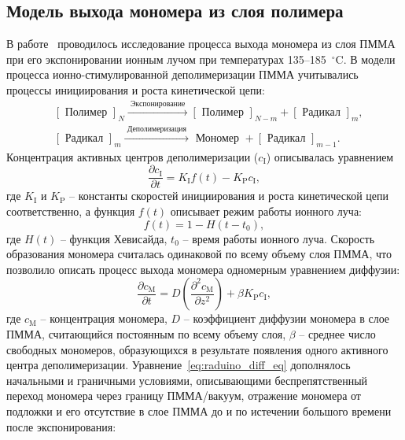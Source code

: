 \subsection{Модель выхода мономера из слоя полимера}
В работе~\cite{Fragala_3_diffusion} проводилось исследование процесса выхода мономера из слоя ПММА при его экспонировании ионным лучом при температурах 135--185~$^\circ$C. В модели процесса ионно-стимулированной деполимеризации \linebreak ПММА учитывались процессы инициирования и роста кинетической цепи:
\begin{equation}
	\begin{aligned}
		&{[\text { Полимер }]_N \stackrel{\text { Экспонирование }}{\longrightarrow}[\text { Полимер }]_{N-m}+[\text { Радикал }]_m,} \\
		&{[\text { Радикал }]_m \stackrel{\text { Деполимеризация }}{\longrightarrow} \text { Мономер }+[\text { Радикал }]_{m-1} .}
	\end{aligned}
\end{equation}
Концентрация активных центров деполимеризации ($c_\mathrm{I}$) описывалась уравнением
\begin{equation}
	\frac{\partial c_\mathrm{I}}{\partial t} = K_\mathrm{I} f(t) - K_\mathrm{P} c_\mathrm{I},
\end{equation}
где $K_\mathrm{I}$ и $K_\mathrm{P}$ -- константы скоростей инициирования и роста кинетической цепи соответственно, а функция $f(t)$ описывает режим работы ионного луча:
\begin{equation}
	f(t) = 1 - H(t - t_0),
\end{equation}
где $H(t)$ -- функция Хевисайда,  $t_0$ -- время работы ионного луча.
Скорость образования мономера считалась одинаковой по всему объему слоя ПММА, что позволило описать процесс выхода мономера одномерным уравнением диффузии:
\begin{equation} \label{eq:raduino_diff_eq}
	\frac{\partial c_\mathrm{M}}{\partial t} = D\left(\frac{\partial^2 c_\mathrm{M}}{\partial z^2}\right) + \beta K_\mathrm{P} c_\mathrm{I},
\end{equation}
где $c_\mathrm{M}$ -- концентрация мономера, $D$ -- коэффициент диффузии мономера в слое ПММА, считающийся постоянным по всему объему слоя, $\beta$ -- среднее число свободных мономеров, образующихся в результате появления одного активного центра деполимеризации. Уравнение~\ref{eq:raduino_diff_eq} дополнялось начальными и граничными условиями, описывающими беспрепятственный переход мономера через границу ПММА/вакуум, отражение мономера от подложки и его отсутствие в слое ПММА до и по истечении большого времени после экспонирования:

